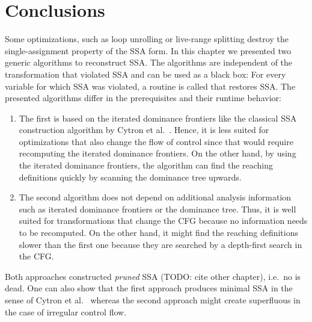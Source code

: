 \section{Conclusions}

Some optimizations, such as loop unrolling or live-range splitting destroy the single-assignment property of the SSA form.
In this chapter we presented two generic algorithms to reconstruct SSA.
The algorithms are independent of the transformation that violated SSA and can be used as a black box:
For every variable for which SSA was violated, a routine is called that restores SSA.
The presented algorithms differ in the prerequisites and their runtime behavior:
\begin{enumerate}
	\item 
		The first is based on the iterated dominance frontiers like the classical SSA construction algorithm by Cytron et al.~\cite{cytron:1991:ssa}.
		Hence, it is less suited for optimizations that also change the flow of control since that would require recomputing the iterated dominance frontiers.
		On the other hand, by using the iterated dominance frontiers, the algorithm can find the reaching definitions quickly by scanning the dominance tree upwards.
	\item 
		The second algorithm does not depend on additional analysis information such as iterated dominance frontiers or the dominance tree.
		Thus, it is well suited for transformations that change the CFG because no information needs to be recomputed.
		On the other hand, it might find the reaching definitions slower than the first one because they are searched by a depth-first search in the CFG.
\end{enumerate}
Both approaches constructed \emph{pruned} SSA (TODO: cite other chapter), i.e.~no \phiop{} is dead. 
One can also show that the first approach produces minimal SSA in the sense of Cytron et al.~\cite{cytron:1991:ssa} whereas the second approach might create superfluous \phiops{} in the case of irregular control flow.
